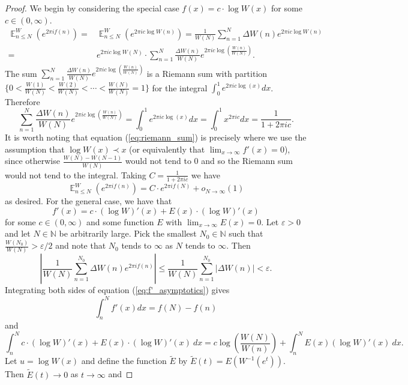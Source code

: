 \documentclass[12pt]{article}
\theoremstyle{plain} %
\theoremstyle{definition} %
\theoremstyle{plain}
\theoremstyle{plain}
\numberwithin{equation}{section}
\newcommand{\N}{\mathbb{N}}
\renewcommand{\epsilon}{\varepsilon}
\renewcommand{\leq}{\leqslant}
\newcommand{\1}{\mathbbm{1}}
\newcommand{\E}{\operatorname{\mathbb{E}}}
\newcommand{\oo}{\infty}
\begin{document}
\begin{proof}
We begin by considering the special case $f(x) = c\cdot \log W(x)$ for some $c\in (0,\oo)$.
    \begin{align*}
         \E_{n\leq N}^W(e^{2\pi i 
        f(n)})=&\E_{n\leq N}^W(e^{2\pi i 
        c\log W(n)}) = \frac{1}{W(N)}\sum_{n=1}^{N}\Delta W(n)e^{2\pi i c\log W(n)}\\ = &e^{2\pi i c\log W(N)}\cdot \sum_{n=1}^{N}\frac{\Delta W(n)}{W(N)}e^{2\pi i c\log\left(\frac{W(n)}{W(N)}\right)}.
    \end{align*}
The sum $\sum_{n=1}^{N}\frac{\Delta W(n)}{W(N)}e^{2\pi i c\log\left(\frac{W(n)}{W(N)}\right)}$ is a Riemann sum with partition $\{0<\frac{W(1)}{W(N)}<\frac{W(2)}{W(N)}<\cdots <\frac{W(N)}{W(N)}=1\}$ for the integral $\int_0^1e^{2\pi i c\log(x)}dx$. Therefore
\begin{equation}\label{eq:riemann_sum}
\sum_{n=1}^{N}\frac{\Delta W(n)}{W(N)}e^{2\pi i c\log\left(\frac{W(n)}{W(N)}\right)}=\int_{0}^1e^{2\pi i c\log(x)}dx = \int_0^1x^{2\pi i c}dx = \frac{1}{1+2\pi i c}.
\end{equation}
It is worth noting that equation (\ref{eq:riemann_sum}) is precisely where we use the assumption that $\log W(x) \prec x$ (or equivalently that $\lim_{x\to\oo}f'(x)=0$), since otherwise $\frac{W(N)-W(N-1)}{W(N)}$ would not tend to $0$ and so the Riemann sum would not tend to the integral. Taking $C = \frac{1}{1+2\pi i c}$ we have 
   \[
   \E_{n\leq N}^W(e^{2\pi i f(n)}) = C\cdot e^{2\pi i f(N)}+o_{N\to\oo}(1)
   \]
as desired. For the general case, we have that
\begin{equation} \label{eq:f'_asymptotics}
f'(x) = c\cdot (\log W)'(x)+E(x)\cdot (\log W)'(x)
\end{equation} 
for some $c\in (0,\oo)$ and some function $E$ with $\lim_{x\to\oo}E(x)=0$. Let $\epsilon>0$ and let $N\in \N$ be arbitrarily large. Pick the smallest $N_0\in \N$ such that $\frac{W(N_0)}{W(N)}>\epsilon/2$ and note that $N_0$ tends to $\oo$ as $N$ tends to $\oo$. Then 
\begin{equation}\label{eq:remove_epsilon_weight}
\left|\frac{1}{W(N)}\sum_{n=1}^{N_0}\Delta W(n)e^{2\pi i f(n)}\right|\leq \frac{1}{W(N)}\sum_{n=1}^{N_0}\left|\Delta W(n)\right|<\epsilon.
\end{equation}
Integrating both sides of equation (\ref{eq:f'_asymptotics}) gives 
\[
\int_n^Nf'(x)dx = f(N)-f(n)
\]
and 
\[
\int_{n}^Nc\cdot (\log W)'(x)+E(x)\cdot (\log W)'(x)~dx = c\log\left(\frac{W(N)}{W(n)}\right) + \int_n^NE(x)(\log W)'(x)~dx. 
\]
Let $u = \log W(x)$ and define the function $\tilde{E}$ by $\tilde{E}(t) = E(W^{-1}(e^t))$. Then $\tilde{E}(t)\to 0$ as $t\to\oo$ and 

\end{proof}
\end{document}

